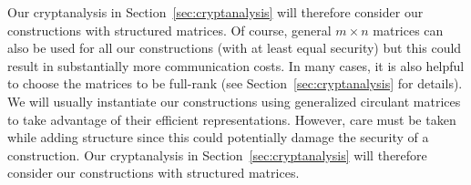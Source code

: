Our cryptanalysis in Section~\ref{sec:cryptanalysis} will therefore consider our constructions with structured matrices. Of course, general $m \times n$ matrices can also be used for all our constructions (with at least equal security) but this could result in substantially more communication costs. In many cases, it is also helpful to choose the matrices to be full-rank (see Section~\ref{sec:cryptanalysis} for details).
\else
We will usually instantiate our constructions using generalized circulant matrices to take advantage of their efficient representations. However, care must be taken while adding structure since this could potentially damage the security of a construction. Our cryptanalysis in Section~\ref{sec:cryptanalysis} will therefore consider our constructions with structured matrices.
\fi





